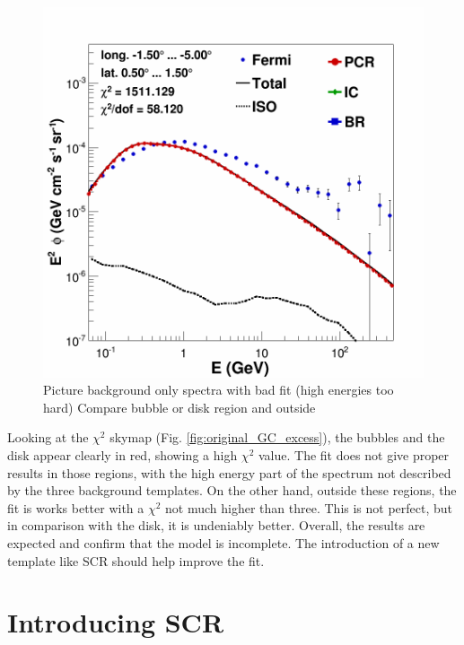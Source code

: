 \begin{figure}[h]
  \centering
  \includegraphics[width=.5\linewidth]{pic/results/BKGonly_CMZ.png}
  \caption{Picture background only spectra with bad fit (high energies too hard) Compare bubble or disk region and outside}
  \label{fig:bkgd_only_spectrum}
\end{figure}

Looking at the $\chi^2$ skymap (Fig. \ref{fig:original_GC_excess}), the bubbles and the disk appear clearly in red, showing a high $\chi^2$ value. The fit does not give proper results in those regions, with the high energy part of the spectrum not described by the three background templates. On the other hand, outside these regions, the fit is works better with a $\chi^2$ not much higher than three. This is not perfect, but in comparison with the disk, it is undeniably better.
Overall, the results are expected and confirm that the model is incomplete. The introduction of a new template like SCR should help improve the fit.






\section{Introducing SCR}

